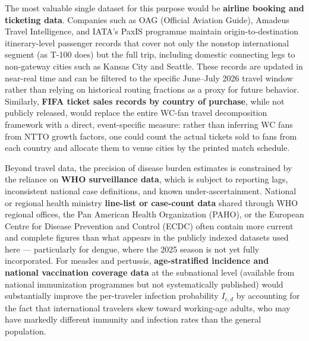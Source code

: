 \documentclass[12pt]{article}
\begin{document}
The most valuable single dataset for this purpose would be
\textbf{airline booking and ticketing data}. Companies such as OAG
(Official Aviation Guide), Amadeus Travel Intelligence, and IATA's
PaxIS programme maintain origin-to-destination itinerary-level passenger
records that cover not only the nonstop international segment (as T-100
does) but the full trip, including domestic connecting legs to non-gateway
cities such as Kansas City and Seattle. These records are updated in
near-real time and can be filtered to the specific June--July 2026 travel
window rather than relying on historical routing fractions as a proxy for
future behavior. Similarly, \textbf{FIFA ticket sales records by country
of purchase}, while not publicly released, would replace the entire
WC-fan travel decomposition framework with a direct, event-specific
measure: rather than inferring WC fans from NTTO growth factors,
one could count the actual tickets sold to fans from each country and
allocate them to venue cities by the printed match schedule.

Beyond travel data, the precision of disease burden estimates is
constrained by the reliance on \textbf{WHO surveillance data}, which is
subject to reporting lags, inconsistent national case definitions, and
known under-ascertainment. National or regional health ministry
\textbf{line-list or case-count data} shared through WHO regional offices,
the Pan American Health Organization (PAHO), or the European Centre for
Disease Prevention and Control (ECDC) often contain more current and
complete figures than what appears in the publicly indexed datasets used
here --- particularly for dengue, where the 2025 season is not yet fully
incorporated. For measles and pertussis, \textbf{age-stratified incidence
and national vaccination coverage data} at the subnational level (available
from national immunization programmes but not systematically published)
would substantially improve the per-traveler infection probability
$I_{c,d}$ by accounting for the fact that international travelers skew
toward working-age adults, who may have markedly different immunity and
infection rates than the general population.
\end{document}
